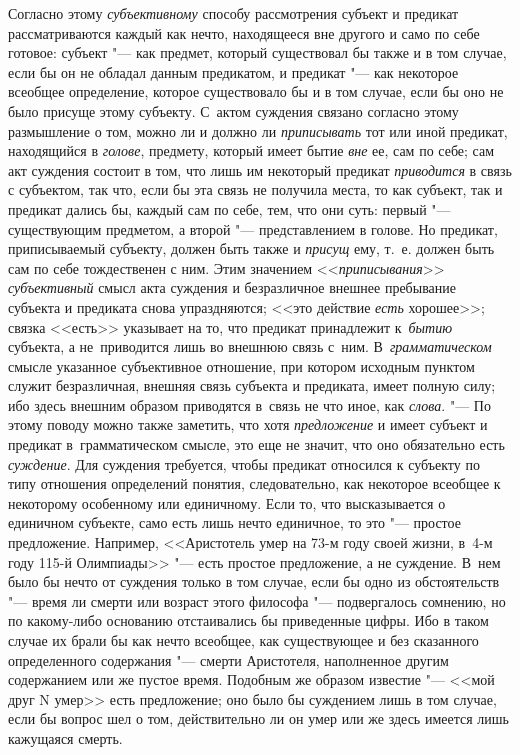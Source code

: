Согласно этому {\em субъективному}
способу рассмотрения субъект и предикат рассматриваются
каждый как нечто, находящееся вне другого и само по себе готовое: субъект
"--- как предмет, который существовал бы также и в том случае,
если бы он не обладал данным предикатом, и предикат "--- как
некоторое всеобщее определение, которое существовало бы и в том случае,
если бы оно не было присуще этому субъекту. С~актом суждения связано
согласно этому размышление о том, можно ли и должно ли
{\em приписывать} тот или иной предикат, находящийся в
{\em голове}, предмету, который имеет бытие {\em вне}
ее, сам по себе; сам акт суждения состоит в том, что лишь им
некоторый предикат {\em приводится}
в связь с субъектом, так что, если бы эта связь не получила
места, то как субъект, так и предикат дались бы, каждый сам по себе, тем,
что они суть: первый "--- существующим предметом, а второй
"--- представлением в голове. Но предикат, приписываемый
субъекту, должен быть также и {\em присущ} ему, т.~е.
должен быть сам по себе тождественен с ним. Этим значением
<<{\em приписывания}>> {\em субъективный} смысл
акта суждения и безразличное внешнее пребывание субъекта и предиката снова
упраздняются; <<это действие {\em есть} хорошее>>; связка <<есть>> указывает
на то, что предикат принадлежит к~{\em бытию} субъекта, а не~приводится лишь
во внешнюю связь с~ним. В~{\em грамматическом} смысле указанное субъективное
отношение, при котором исходным пунктом служит безразличная, внешняя связь
субъекта и предиката, имеет полную силу; ибо здесь внешним образом приводятся
в~связь не что иное, как {\em слова}. "--- По этому поводу можно также
заметить, что хотя {\em предложение} и имеет субъект и предикат
в~грамматическом смысле, это еще не значит, что оно обязательно есть
{\em суждение}. Для суждения требуется, чтобы предикат относился к субъекту
по типу отношения определений понятия, следовательно, как некоторое
всеобщее к некоторому особенному или единичному. Если то,
что высказывается о единичном субъекте, само есть лишь нечто единичное, то
это "--- простое предложение. Например, <<Аристотель умер на 73-м году своей
жизни, в~4-м году 115-й
Олимпиады>> "--- есть простое предложение, а не суждение. В~нем было бы нечто
от суждения только в том случае, если бы одно из обстоятельств "--- время ли
смерти или возраст этого философа "--- подвергалось сомнению, но по какому-либо
основанию отстаивались бы приведенные цифры. Ибо в таком случае их брали бы как
нечто всеобщее, как существующее и без сказанного определенного содержания "---
смерти Аристотеля, наполненное другим содержанием или же пустое время. Подобным
же образом известие "--- <<мой друг N умер>> есть предложение; оно было бы
суждением лишь в том случае, если бы вопрос шел о том, действительно ли он умер
или же здесь имеется лишь кажущаяся смерть.


